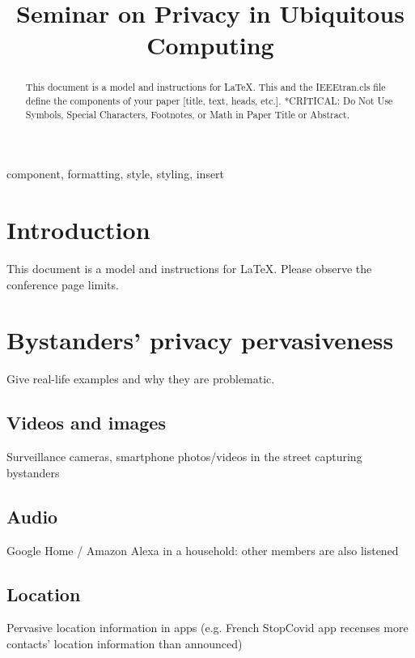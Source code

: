 \documentclass[conference]{IEEEtran}
\begin{document}
\title{Seminar on Privacy in Ubiquitous Computing}


\author{
\and
{}
}


\maketitle

\begin{abstract}
This document is a model and instructions for \LaTeX.
This and the IEEEtran.cls file define the components of your paper [title, text, heads, etc.]. *CRITICAL: Do Not Use Symbols, Special Characters, Footnotes, 
or Math in Paper Title or Abstract.
\end{abstract}

\begin{IEEEkeywords}
component, formatting, style, styling, insert
\end{IEEEkeywords}

\section{Introduction}
This document is a model and instructions for \LaTeX.
Please observe the conference page limits. 

\section{Bystanders’ privacy pervasiveness}
Give real-life examples and why they are problematic.
\subsection{Videos and images}
Surveillance cameras, smartphone photos/videos in the street capturing bystanders
\subsection{Audio}
Google Home / Amazon Alexa in a household: other members are also listened
\subsection{Location}
Pervasive location information in apps (e.g. French StopCovid app recenses more contacts’ location information than announced)
\end{document}
